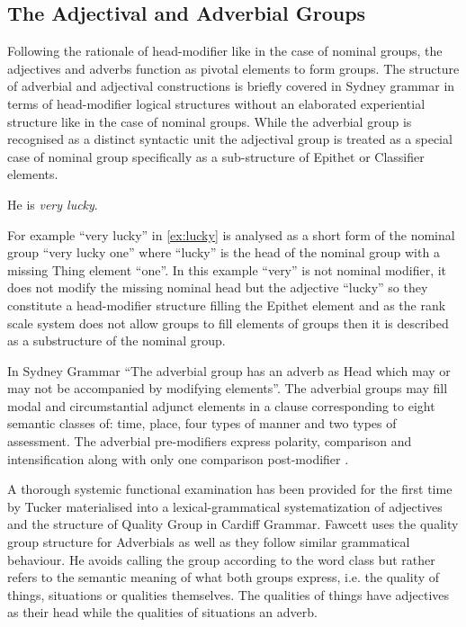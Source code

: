 	\subsection{The Adjectival and Adverbial Groups}
	\label{sec:advectival-adverbial-groups}
	Following the rationale of head-modifier like in the case of nominal groups, the adjectives and adverbs function as pivotal elements to form groups. The structure of adverbial and adjectival constructions is briefly covered in Sydney grammar in terms of head-modifier logical structures without an elaborated experiential structure like in the case of nominal groups. While the adverbial group is recognised as a distinct syntactic unit the adjectival group is treated as a special case of nominal group specifically as a sub-structure of Epithet or Classifier elements.
	
	\begin{exe}
		\ex\label{ex:lucky} He is \textit{very lucky}.
	\end{exe}
	
	For example ``very lucky'' in \ref{ex:lucky} is analysed as a short form of the nominal group ``very lucky one'' where ``lucky'' is the head of the nominal group with a missing Thing element ``one''. In this example ``very'' is not nominal modifier, it does not modify the missing nominal head but the adjective ``lucky'' so they constitute a head-modifier structure filling the Epithet element and as the rank scale system does not allow groups to fill elements of groups then it is described as a substructure of the nominal group.
	
	In Sydney Grammar ``The adverbial group has an adverb as Head which may or may not be accompanied by modifying elements''\citep[419]{Halliday2013}. The adverbial groups may fill modal and circumstantial adjunct elements in a clause corresponding to eight semantic classes of: time, place, four types of manner and two types of assessment. The adverbial pre-modifiers express polarity, comparison and intensification along with only one comparison post-modifier \citep[420-421]{Halliday2013}. 
	
	
	A thorough systemic functional examination has been provided for the first time by Tucker \citet{Tucker1997,Tucker1998} materialised into a lexical-grammatical systematization of adjectives and the structure of Quality Group in Cardiff Grammar. Fawcett uses the quality group structure for Adverbials as well as they follow similar grammatical behaviour. He avoids calling the group according to the word class but rather refers to the semantic meaning of what both groups express, i.e. the quality of things, situations or qualities themselves. The qualities of things have adjectives as their head while the qualities of situations an adverb. 
	
